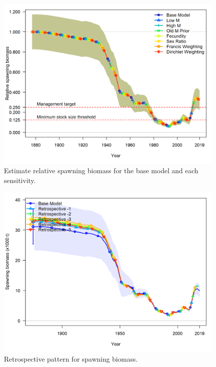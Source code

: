 \documentclass[12pt,]{article}
\begin{document}
\FloatBarrier

\begin{figure}
\centering
\includegraphics{Figures/depl_sens.png}
\caption{Estimate relative spawning biomass for the base model and each
sensitivity. \label{fig:sens_depl}}
\end{figure}

\FloatBarrier

\begin{figure}
\centering
\includegraphics{Figures/retro_ssb.png}
\caption{Retrospective pattern for spawning biomass.
\label{fig:retro_ssb}}
\end{figure}
\end{document}
